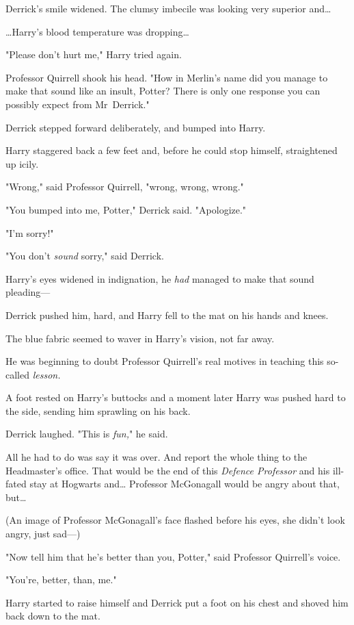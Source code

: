 Derrick's smile widened. The clumsy imbecile was looking very superior
and{\ldots}

{\ldots}Harry's blood temperature was dropping{\ldots}

"Please don't hurt me," Harry tried again.

Professor Quirrell shook his head. "How in Merlin's name did you manage to make
that sound like an insult, Potter? There is only one response you can possibly
expect from Mr~Derrick."

Derrick stepped forward deliberately, and bumped into Harry.

Harry staggered back a few feet and, before he could stop himself, straightened
up icily.

"Wrong," said Professor Quirrell, "wrong, wrong, wrong."

"You bumped into me, Potter," Derrick said. "Apologize."

"I'm sorry!"

"You don't \emph{sound} sorry," said Derrick.

Harry's eyes widened in indignation, he \emph{had} managed to make that sound
pleading---

Derrick pushed him, hard, and Harry fell to the mat on his hands and knees.

The blue fabric seemed to waver in Harry's vision, not far away.

He was beginning to doubt Professor Quirrell's real motives in teaching this
so-called \emph{lesson.}

A foot rested on Harry's buttocks and a moment later Harry was pushed hard to
the side, sending him sprawling on his back.

Derrick laughed. "This is \emph{fun,}" he said.

All he had to do was say it was over. And report the whole thing to the
Headmaster's office. That would be the end of this \emph{Defence Professor} and
his ill-fated stay at Hogwarts and{\ldots} Professor McGonagall would be angry
about that, but{\ldots}

(An image of Professor McGonagall's face flashed before his eyes, she didn't
look angry, just sad---)

"Now tell him that he's better than you, Potter," said Professor Quirrell's
voice.

"You're, better, than, me."

Harry started to raise himself and Derrick put a foot on his chest and shoved
him back down to the mat.

